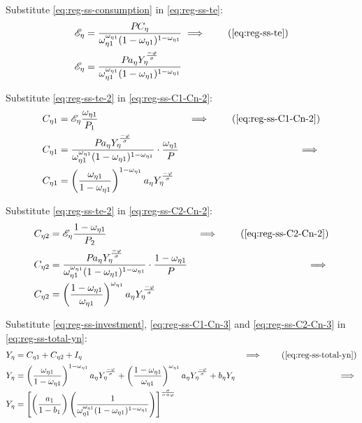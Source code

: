\documentclass[
thesis.tex
]{subfiles}
\begin{document}
	Substitute \ref{eq:reg-ss-consumption} in \ref{eq:reg-ss-te}:
	\begin{align}
		\te[] &= \frac{P_{} C_{\eta}}{\omega_{\eta 1}^{\omega_{\eta 1}} (1 -\omega_{\eta 1})^{1 -\omega_{\eta 1}}} \implies \tag{\ref{eq:reg-ss-te}} \\
		\te[] &= \frac{P_{} a_{\eta} Y_{\eta}^{\frac{-\varphi}{\sigma}}}{\omega_{\eta 1}^{\omega_{\eta 1}} (1 -\omega_{\eta 1})^{1 -\omega_{\eta 1}}} \label{eq:reg-ss-te-2}
	\end{align}

	Substitute \ref{eq:reg-ss-te-2} in \ref{eq:reg-ss-C1-Cn-2}:
	\begin{alignat}{2}
		C_{\eta 1} &= \te[] \frac{\omega_{\eta 1}}{P_{1}} &\implies \tag{\ref{eq:reg-ss-C1-Cn-2}} \\
		C_{\eta 1} &= \frac{P_{} a_{\eta} Y_{\eta}^{\frac{-\varphi}{\sigma}}}{\omega_{\eta 1}^{\omega_{\eta 1}} (1 -\omega_{\eta 1})^{1 -\omega_{\eta 1}}} \cdot \frac{\omega_{\eta 1}}{P_{}} &\implies \nonumber \\
		C_{\eta 1} &= \left( \frac{\omega_{\eta 1}}{1 -\omega_{\eta 1}} \right)^{1 -\omega_{\eta 1}} a_{\eta} Y_{\eta}^{\frac{-\varphi}{\sigma}} \label{eq:reg-ss-C1-Cn-3}
	\end{alignat}
		
	Substitute \ref{eq:reg-ss-te-2} in \ref{eq:reg-ss-C2-Cn-2}:
	\begin{alignat}{2}
		C_{\eta 2} &= \te[] \frac{1 -\omega_{\eta 1}}{P_{2}} &\implies \tag{\ref{eq:reg-ss-C2-Cn-2}} \\
		C_{\eta 2} &= \frac{P_{} a_{\eta} Y_{\eta}^{\frac{-\varphi}{\sigma}}}{\omega_{\eta 1}^{\omega_{\eta 1}} (1 -\omega_{\eta 1})^{1 -\omega_{\eta 1}}} \cdot \frac{1 -\omega_{\eta 1}}{P_{}} &\implies \nonumber \\
		C_{\eta 2} &= \left( \frac{1 -\omega_{\eta 1}}{\omega_{\eta 1}} \right)^{\omega_{\eta 1}} a_{\eta} Y_{\eta}^{\frac{-\varphi}{\sigma}} \label{eq:reg-ss-C2-Cn-3}
	\end{alignat}


Substitute \ref{eq:reg-ss-investment}, \ref{eq:reg-ss-C1-Cn-3} and \ref{eq:reg-ss-C2-Cn-3} in \ref{eq:reg-ss-total-yn}:
	\begin{alignat}{2}
		Y_{\eta} &= C_{\eta 1} + C_{\eta 2} + I_{\eta} &\implies \tag{\ref{eq:reg-ss-total-yn}} \\
		Y_{\eta} &= \left( \frac{\omega_{\eta 1}}{1 - \omega_{\eta 1}} \right)^{1 - \omega_{\eta 1}} a_{\eta} Y_{\eta}^{\frac{-\varphi}{\sigma}} + \left( \frac{1 -\omega_{\eta 1}}{\omega_{\eta 1}} \right)^{\omega_{\eta 1}} a_{\eta} Y_{\eta}^{\frac{-\varphi}{\sigma}} + b_{\eta} Y_{\eta} &\implies \nonumber \\
		Y_{\eta} &= \left[ \left( \frac{a_{1}}{1 - b_{1}} \right) \left( \frac{1}{\omega_{\eta 1}^{\omega_{\eta 1}} (1 - \omega_{\eta 1})^{1 - \omega_{\eta 1}}} \right) \right]^{\frac{\sigma}{\sigma + \varphi}} \label{eq:reg-ss-total-yn-2}
	\end{alignat}
\end{document}
